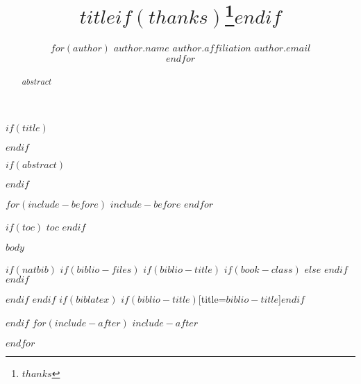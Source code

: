 \documentclass[12pt,usenames,dvipsnames,article,oneside,$if(fontsize)$$fontsize$,$endif$$if(lang)$$lang$,$endif$]{$documentclass$}
\title{\Huge $title$$if(thanks)$\thanks{$thanks$}$endif$}
\author{$for(author)$ \href{$author.website$}{$author.name$}\newline
$author.affiliation$\newline
{\footnotesize \ttfamily \href{mailto:$author.email$}{$author.email$}}\\ \bigskip
$endfor$}
\date{}
\begin{document}
  \def\ind{\hangindent=1 true cm\hangafter=1 \noindent}
  \def\labelitemi{~}
  \renewcommand{\labelitemii}{~}

$if(title)$
\maketitle
$endif$

$if(abstract)$
\renewcommand{\abstractname}{}
\begin{abstract}
\noindent $abstract$
\end{abstract}
$endif$

$for(include-before)$
$include-before$
$endfor$

$if(toc)$
{
\hypersetup{linkcolor=black}
$toc$ \pagebreak
}
$endif$

$body$


$if(natbib)$
$if(biblio-files)$
$if(biblio-title)$
$if(book-class)$
\renewcommand\bibname{$biblio-title$}
$else$
\renewcommand\refname{$biblio-title$}
$endif$
$endif$


$endif$
$endif$
$if(biblatex)$
\printbibliography$if(biblio-title)$[title=$biblio-title$]$endif$

$endif$
$for(include-after)$
$include-after$

$endfor$
\end{document}
